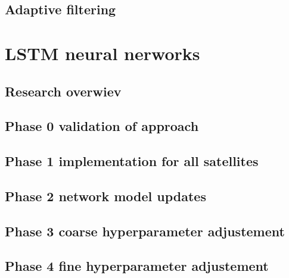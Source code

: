 \subsection{Adaptive filtering}


\section{LSTM neural nerworks}

\subsection{Research overwiev}

\subsection{Phase 0 validation of approach}

\subsection{Phase 1 implementation for all satellites}

\subsection{Phase 2 network model updates}

\subsection{Phase 3 coarse hyperparameter adjustement}

\subsection{Phase 4 fine hyperparameter adjustement}


